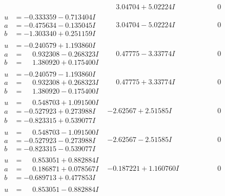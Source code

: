 \documentclass[1p]{elsarticle_modified}
\theoremstyle{definition}
\begin{document}
$$\begin{array}{c|c|c}
 & \phantom{-}3.04704 + 5.02224 I & \phantom{-0.000000 } 0 \\ \hline\begin{aligned}
u &= -0.333359 - 0.713404 I \\
a &= -0.475634 - 0.135045 I \\
b &= -1.303340 + 0.251159 I\end{aligned}
 & \phantom{-}3.04704 - 5.02224 I & \phantom{-0.000000 } 0 \\ \hline\begin{aligned}
u &= -0.240579 + 1.193860 I \\
a &= \phantom{-}0.932308 - 0.268323 I \\
b &= \phantom{-}1.380920 + 0.175400 I\end{aligned}
 & \phantom{-}0.47775 - 3.33774 I & \phantom{-0.000000 } 0 \\ \hline\begin{aligned}
u &= -0.240579 - 1.193860 I \\
a &= \phantom{-}0.932308 + 0.268323 I \\
b &= \phantom{-}1.380920 - 0.175400 I\end{aligned}
 & \phantom{-}0.47775 + 3.33774 I & \phantom{-0.000000 } 0 \\ \hline\begin{aligned}
u &= \phantom{-}0.548703 + 1.091500 I \\
a &= -0.527923 + 0.273988 I \\
b &= -0.823315 + 0.539077 I\end{aligned}
 & -2.62567 + 2.51585 I & \phantom{-0.000000 } 0 \\ \hline\begin{aligned}
u &= \phantom{-}0.548703 - 1.091500 I \\
a &= -0.527923 - 0.273988 I \\
b &= -0.823315 - 0.539077 I\end{aligned}
 & -2.62567 - 2.51585 I & \phantom{-0.000000 } 0 \\ \hline\begin{aligned}
u &= \phantom{-}0.853051 + 0.882884 I \\
a &= \phantom{-}0.186871 + 0.078567 I \\
b &= -0.689713 + 0.477853 I\end{aligned}
 & -0.187221 + 1.160760 I & \phantom{-0.000000 } 0 \\ \hline\begin{aligned}
u &= \phantom{-}0.853051 - 0.882884 I \\

\end{aligned}
\end{array}$$
\end{document}
